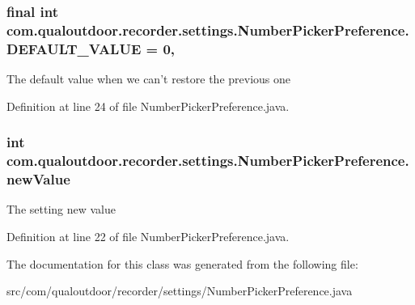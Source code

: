 \hypertarget{classcom_1_1qualoutdoor_1_1recorder_1_1settings_1_1NumberPickerPreference_a5613d0ea5422ee2aea4f52ea535ef9cc}{
\subsubsection[{D\-E\-F\-A\-U\-L\-T\-\_\-\-V\-A\-L\-U\-E}]{\setlength{\rightskip}{0pt plus 5cm}final int com.\-qualoutdoor.\-recorder.\-settings.\-Number\-Picker\-Preference.\-D\-E\-F\-A\-U\-L\-T\-\_\-\-V\-A\-L\-U\-E = 0\hspace{0.3cm}{\ttfamily [static]}, {\ttfamily [private]}}}\label{classcom_1_1qualoutdoor_1_1recorder_1_1settings_1_1NumberPickerPreference_a5613d0ea5422ee2aea4f52ea535ef9cc}
The default value when we can't restore the previous one 

Definition at line 24 of file Number\-Picker\-Preference.\-java.

\hypertarget{classcom_1_1qualoutdoor_1_1recorder_1_1settings_1_1NumberPickerPreference_a3c29dd0a4db25ef361edb52b989e1478}{
\subsubsection[{new\-Value}]{\setlength{\rightskip}{0pt plus 5cm}int com.\-qualoutdoor.\-recorder.\-settings.\-Number\-Picker\-Preference.\-new\-Value\hspace{0.3cm}{\ttfamily [private]}}}\label{classcom_1_1qualoutdoor_1_1recorder_1_1settings_1_1NumberPickerPreference_a3c29dd0a4db25ef361edb52b989e1478}
The setting new value 

Definition at line 22 of file Number\-Picker\-Preference.\-java.



The documentation for this class was generated from the following file\-:\begin{DoxyCompactItemize}
\item 
src/com/qualoutdoor/recorder/settings/Number\-Picker\-Preference.\-java\end{DoxyCompactItemize}
